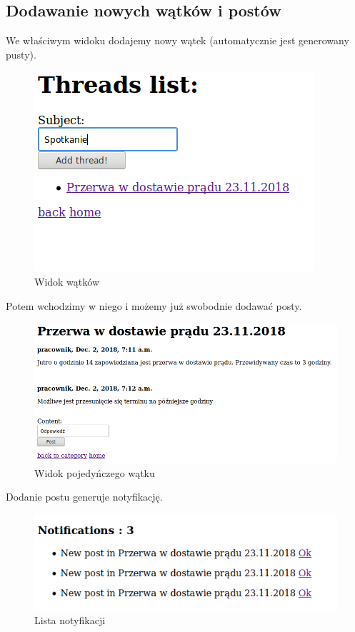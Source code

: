 \documentclass[12pt]{article}
\begin{document}
	\subsection{Dodawanie nowych wątków i postów}
	We właściwym widoku dodajemy nowy wątek (automatycznie jest generowany pusty).
	\begin{figure}[H]
		\centering
		\includegraphics[scale=0.7]{img/11.png}
		\caption{Widok wątków}
	\end{figure}
	Potem wchodzimy w niego i możemy już swobodnie dodawać posty.
	\begin{figure}[H]
		\centering
		\includegraphics[scale=0.5]{img/13.png}
		\caption{Widok pojedyńczego wątku}
	\end{figure}
	Dodanie postu generuje notyfikację.
	\begin{figure}[H]
		\centering
		\includegraphics[scale=0.7]{img/14.png}
		\caption{Lista notyfikacji}
	\end{figure}
	
\end{document}
